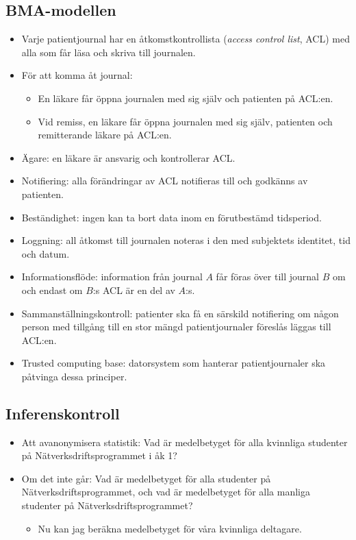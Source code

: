 \subsection{BMA-modellen}
\begin{frame}[allowframebreaks]{\insertsubsectionhead}
  \begin{itemize}
    \item Varje patientjournal har en åtkomstkontrollista (\emph{access control 
      list}, ACL) med alla som får läsa och skriva till journalen.
    \item För att komma åt journal:
      \begin{itemize}
        \item En läkare får öppna journalen med sig själv och patienten på 
          ACL:en.
        \item Vid remiss, en läkare får öppna journalen med sig själv, 
          patienten och remitterande läkare på ACL:en.
      \end{itemize}
    \item Ägare: en läkare är ansvarig och kontrollerar ACL.
    \item Notifiering: alla förändringar av ACL notifieras till och godkänns av 
      patienten.
    \item Beständighet: ingen kan ta bort data inom en förutbestämd tidsperiod.
    \item Loggning: all åtkomst till journalen noteras i den med subjektets 
      identitet, tid och datum.
    \item Informationsflöde: information från journal \(A\) får föras över till 
      journal \(B\) om och endast om \(B\):s ACL är en del av \(A\):s.
    \item Sammanställningskontroll: patienter ska få en särskild notifiering om 
      någon person med tillgång till en stor mängd patientjournaler föreslås 
      läggas till ACL:en.
    \item Trusted computing base: datorsystem som hanterar patientjournaler ska 
      påtvinga dessa principer.
  \end{itemize}
\end{frame}

\subsection{Inferenskontroll}
\begin{frame}{\insertsubsectionhead}
  \begin{itemize}
    \item Att avanonymisera statistik: Vad är medelbetyget för alla kvinnliga 
      studenter på Nätverksdriftsprogrammet i åk 1?
    \item Om det inte går: Vad är medelbetyget för alla studenter på 
      Nätverksdriftsprogrammet, och vad är medelbetyget för alla manliga 
      studenter på Nätverksdriftsprogrammet?
      \begin{itemize}
        \item Nu kan jag beräkna medelbetyget för våra kvinnliga deltagare.
      \end{itemize}
  \end{itemize}
\end{frame}



\begin{frame}[allowframebreaks]
  \printbibliography{}
\end{frame}
